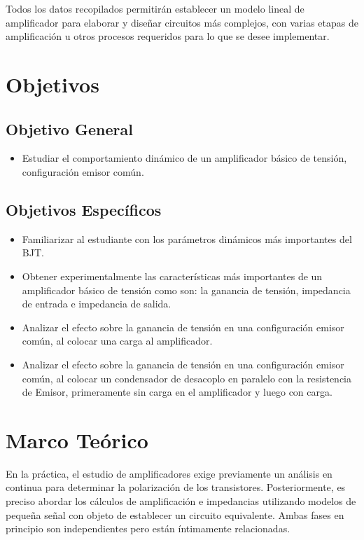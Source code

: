 \documentclass[10pt, a4paper]{article}
\begin{document}
    Todos los datos recopilados permitirán establecer un modelo lineal de amplificador para elaborar y diseñar circuitos más complejos, con varias etapas de amplificación u otros procesos requeridos para lo que se desee implementar.

    \newpage

    \section{Objetivos}

    \subsection{Objetivo General}
    \begin{itemize}
        \item Estudiar el comportamiento dinámico de un amplificador básico de tensión, configuración emisor común.
    \end{itemize}

    \subsection{Objetivos Específicos}
    \begin{itemize}
        \item Familiarizar al estudiante con los parámetros dinámicos más importantes del BJT.
        \item Obtener experimentalmente las características más importantes de un amplificador básico de tensión como son: la ganancia de tensión, impedancia de entrada e impedancia de salida.
        \item Analizar el efecto sobre la ganancia de tensión en una configuración emisor común, al colocar una carga al amplificador.
        \item Analizar el efecto sobre la ganancia de tensión en una configuración emisor común, al colocar un condensador de desacoplo en paralelo con la resistencia de Emisor, primeramente sin carga en el amplificador y luego con carga.
    \end{itemize}

    \newpage

    \section{Marco Teórico}

    En la práctica, el estudio de amplificadores exige previamente un análisis en continua para determinar la polarización de los transistores. Posteriormente, es preciso abordar los cálculos de amplificación e impedancias utilizando modelos de pequeña señal con objeto de establecer un circuito equivalente. Ambas fases en principio son independientes pero están íntimamente relacionadas.
\end{document}

